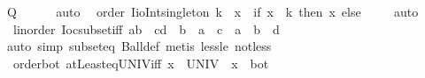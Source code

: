 \begin{isabellebody}
\ {\isacharquery}{\kern0pt}Q\isanewline
\ \ \ \ \isamarkupfalse%
\ auto\isanewline
{}\isamarkupfalse%
%
\endisatagproof
{\isafoldproof}%
%
\isadelimproof
\isanewline
%
\endisadelimproof
\isanewline
{}\isamarkupfalse%
\ {\isacharparenleft}{\kern0pt}\ order{\isacharparenright}{\kern0pt}\ Iio{\isacharunderscore}{\kern0pt}Int{\isacharunderscore}{\kern0pt}singleton{\isacharcolon}{\kern0pt}\ {\isachardoublequoteopen}{\isacharbraceleft}{\kern0pt}{\isachardot}{\kern0pt}{\isachardot}{\kern0pt}{\isacharless}{\kern0pt}k{\isacharbraceright}{\kern0pt}\ {\isasyminter}\ {\isacharbraceleft}{\kern0pt}x{\isacharbraceright}{\kern0pt}\ {\isacharequal}{\kern0pt}\ {\isacharparenleft}{\kern0pt}if\ x\ {\isacharless}{\kern0pt}\ k\ then\ {\isacharbraceleft}{\kern0pt}x{\isacharbraceright}{\kern0pt}\ else\ {\isacharbraceleft}{\kern0pt}{\isacharbraceright}{\kern0pt}{\isacharparenright}{\kern0pt}{\isachardoublequoteclose}\isanewline
%
\isadelimproof
\ \ %
\endisadelimproof
%
\isatagproof
{}\isamarkupfalse%
\ auto%
\endisatagproof
{\isafoldproof}%
%
\isadelimproof
\isanewline
%
\endisadelimproof
\isanewline
{}\isamarkupfalse%
\ {\isacharparenleft}{\kern0pt}\ linorder{\isacharparenright}{\kern0pt}\ Ioc{\isacharunderscore}{\kern0pt}subset{\isacharunderscore}{\kern0pt}iff{\isacharcolon}{\kern0pt}\ {\isachardoublequoteopen}{\isacharbraceleft}{\kern0pt}a{\isacharless}{\kern0pt}{\isachardot}{\kern0pt}{\isachardot}{\kern0pt}b{\isacharbraceright}{\kern0pt}\ {\isasymsubseteq}\ {\isacharbraceleft}{\kern0pt}c{\isacharless}{\kern0pt}{\isachardot}{\kern0pt}{\isachardot}{\kern0pt}d{\isacharbraceright}{\kern0pt}\ {\isasymlongleftrightarrow}\ {\isacharparenleft}{\kern0pt}b\ {\isasymle}\ a\ {\isasymor}\ c\ {\isasymle}\ a\ {\isasymand}\ b\ {\isasymle}\ d{\isacharparenright}{\kern0pt}{\isachardoublequoteclose}\isanewline
%
\isadelimproof
\ \ %
\endisadelimproof
%
\isatagproof
{}\isamarkupfalse%
\ {\isacharparenleft}{\kern0pt}auto\ simp{\isacharcolon}{\kern0pt}\ subset{\isacharunderscore}{\kern0pt}eq\ Ball{\isacharunderscore}{\kern0pt}def{\isacharparenright}{\kern0pt}\ {\isacharparenleft}{\kern0pt}metis\ less{\isacharunderscore}{\kern0pt}le\ not{\isacharunderscore}{\kern0pt}less{\isacharparenright}{\kern0pt}%
\endisatagproof
{\isafoldproof}%
%
\isadelimproof
\isanewline
%
\endisadelimproof
\isanewline
{}\isamarkupfalse%
\ {\isacharparenleft}{\kern0pt}\ order{\isacharunderscore}{\kern0pt}bot{\isacharparenright}{\kern0pt}\ atLeast{\isacharunderscore}{\kern0pt}eq{\isacharunderscore}{\kern0pt}UNIV{\isacharunderscore}{\kern0pt}iff{\isacharcolon}{\kern0pt}\ {\isachardoublequoteopen}{\isacharbraceleft}{\kern0pt}x{\isachardot}{\kern0pt}{\isachardot}{\kern0pt}{\isacharbraceright}{\kern0pt}\ {\isacharequal}{\kern0pt}\ UNIV\ {\isasymlongleftrightarrow}\ x\ {\isacharequal}{\kern0pt}\ bot{\isachardoublequoteclose}\isanewline

\end{isabellebody}
